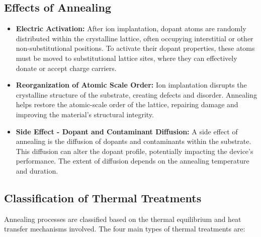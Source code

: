 \documentclass{report}
\begin{document}
\subsection{Effects of Annealing}
\begin{itemize}
    \item \textbf{Electric Activation:} After ion implantation, dopant atoms are randomly distributed within the crystalline lattice, often occupying interstitial or other non-substitutional positions. To activate their dopant properties, these atoms must be moved to substitutional lattice sites, where they can effectively donate or accept charge carriers.
    \item \textbf{Reorganization of Atomic Scale Order:} Ion implantation disrupts the crystalline structure of the substrate, creating defects and disorder. Annealing helps restore the atomic-scale order of the lattice, repairing damage and improving the material's structural integrity.
    \item \textbf{Side Effect - Dopant and Contaminant Diffusion:} A side effect of annealing is the diffusion of dopants and contaminants within the substrate. This diffusion can alter the dopant profile, potentially impacting the device's performance. The extent of diffusion depends on the annealing temperature and duration.
\end{itemize}

\subsection{Classification of Thermal Treatments}
Annealing processes are classified based on the thermal equilibrium and heat transfer mechanisms involved. The four main types of thermal treatments are:
\end{document}
